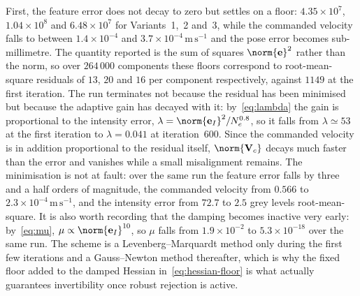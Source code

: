 First, the feature error does not decay to zero but settles on a floor:
$4.35\times10^{7}$, $1.04\times10^{8}$ and $6.48\times10^{7}$ for
Variants~1,~2 and~3, while the commanded velocity falls to between
$1.4\times10^{-4}$ and $3.7\times10^{-4}\,\mathrm{m\,s^{-1}}$ and the pose
error becomes sub-millimetre. The quantity reported is the sum of squares
$\norm{\mathbf{e}}^{2}$ rather than the norm, so over $264\,000$ components
these floors correspond to root-mean-square residuals of $13$, $20$ and $16$
per component respectively, against $1149$ at the first iteration.
The run terminates not because the residual has been minimised but because the
adaptive gain has decayed with it: by~\eqref{eq:lambda} the gain is
proportional to the intensity error, $\lambda=\norm{\mathbf{e}_I}^{2}/N_{e}^{0.8}$,
so it falls from $\lambda\simeq53$ at the first iteration to $\lambda=0.041$ at
iteration~600. Since the commanded velocity is in addition proportional to the
residual itself, $\norm{\mathbf{V}_c}$ decays much faster than the error and
vanishes while a small misalignment remains. The minimisation is not at fault:
over the same run the feature error falls by three and a half orders of
magnitude, the commanded velocity from $0.566$ to
$2.3\times10^{-4}\,\mathrm{m\,s^{-1}}$, and the intensity error from $72.7$ to
$2.5$ grey levels root-mean-square. It is also worth recording that the damping
becomes inactive very early: by~\eqref{eq:mu}, $\mu\propto\norm{\mathbf{e}_I}^{10}$,
so $\mu$ falls from $1.9\times10^{-2}$ to $5.3\times10^{-18}$ over the same run.
The scheme is a Levenberg--Marquardt method only during the first few iterations
and a Gauss--Newton method thereafter, which is why the fixed floor added to the
damped Hessian in~\eqref{eq:hessian-floor} is what actually guarantees
invertibility once robust rejection is active.

